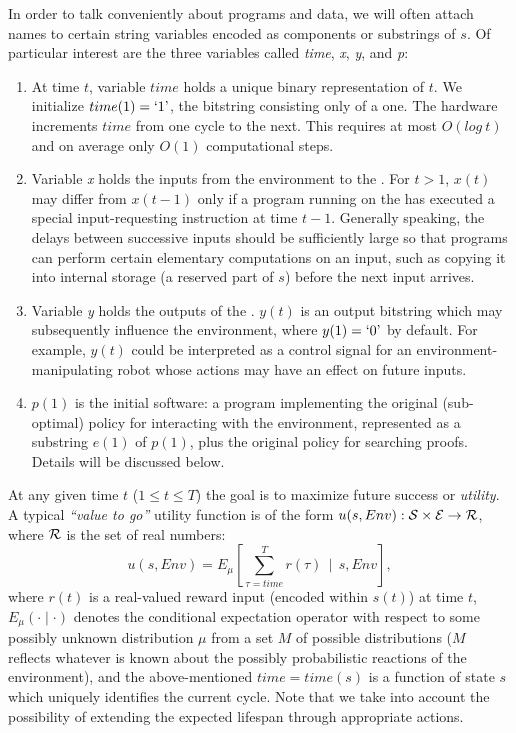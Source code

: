 In order to talk conveniently about programs and data,
we will often attach names to certain string variables encoded
as components or substrings of $s$.
Of particular interest are the three variables called
{\em time}, {\em x}, {\em y}, and {\em p}:
\begin{enumerate}
\item At time $t$, variable $time$
holds a unique binary representation of $t$.
We initialize $time(1)=`1\textrm{'}$, the bitstring consisting only of a one.
The hardware increments $time$ from one cycle to the next.
This requires at most $O(log~t)$ and on average only $O(1)$
computational steps.
 
\item
Variable {\em x} holds the inputs from the environment to the \gmn.
For $t>1$, $x(t)$  may
differ from $x(t-1)$ only if
a program running on the \gm has executed
a special input-requesting instruction at time $t-1$.
Generally speaking, the delays between successive inputs
should be sufficiently large so that
programs can perform
certain elementary computations on an input, such as copying
it into internal storage (a reserved part of $s$)
before the next input arrives.
  
  \item
Variable {\em y} holds the outputs of the \gmn.
$y(t)$ is an output bitstring which may 
subsequently influence the
environment, where $y(1)=`0\textrm{'}$ by default.
For example, $y(t)$ could be interpreted as a control
signal for an environment-manipulating
robot whose actions may have an effect on
future inputs.

\item
$p(1)$ is the initial software: a program
implementing the original (sub-optimal) policy 
for interacting with the environment,
represented as a substring $e(1)$ of $p(1)$,
plus the original policy for searching proofs.
Details will be discussed below.
\end{enumerate}

At any given time $t$ ($1 \leq t \leq T$) the goal 
is to maximize future success or {\em utility}.
A typical {\em ``value to go''} utility function
is of the form $u(s, Env): \cal S \times \cal E \rightarrow R$, where
$\cal R$ is the set of real numbers:
\begin{equation}
\label{u}
u(s, Env) =
E_{\mu} \left [ \sum_{\tau=time}^T  r(\tau)~~ \Bigg| ~~s, Env \right ],
\end{equation}
where $r(t)$ is a real-valued reward input (encoded within $s(t)$) at time $t$, 
$E_{\mu}(\cdot \mid \cdot)$ denotes the conditional expectation operator
with respect to some possibly unknown distribution $\mu$ from a set $M$
of possible distributions ($M$ reflects
whatever is known about the possibly probabilistic reactions 
of the environment), and the above-mentioned $time=time(s)$ is a function 
of state $s$ which uniquely identifies the 
current cycle.
Note that we take into account the possibility of extending
the expected lifespan
through appropriate actions.

